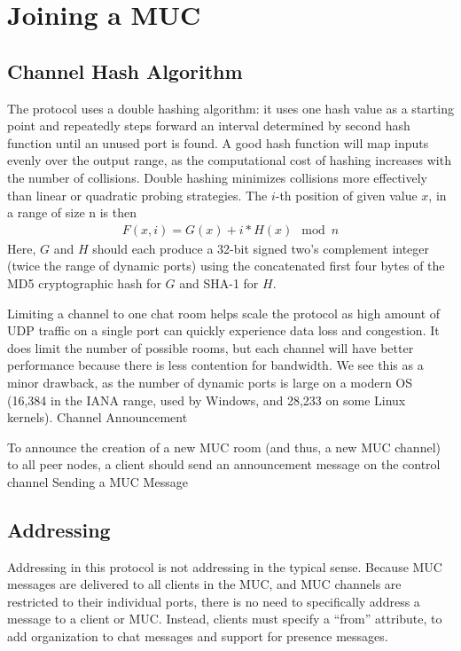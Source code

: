 \documentclass{article}
\begin{document}
\section{Joining a MUC}

\subsection{Channel Hash Algorithm}

The protocol uses a double hashing algorithm: it uses one hash value as a
starting point and repeatedly steps forward an interval determined by second
hash function until an unused port is found. A good hash function will map
inputs evenly over the output range, as the computational cost of hashing
increases with the number of collisions. Double hashing minimizes collisions
more effectively than linear or quadratic probing strategies. The $i$-th position
of given value $x$, in a range of size n is then 
\begin{align*}
F(x,i) = G(x) + i * H(x)\mod{n}
\end{align*}
Here, $G$
and $H$ should each produce a 32-bit signed two's complement integer (twice the
range of dynamic ports) using the concatenated first four bytes of the MD5
cryptographic hash for $G$ and SHA-1 for $H$.

Limiting a channel to one chat room helps scale the protocol as high amount of
UDP traffic on a single port can quickly experience data loss and congestion. It
does limit the number of possible rooms, but each channel will have better
performance because there is less contention for bandwidth. We see this as a
minor drawback, as the number of dynamic ports is large on a modern OS (16,384
in the IANA range, used by Windows, and 28,233 on some Linux kernels).
Channel Announcement

To announce the creation of a new MUC room (and thus, a new MUC channel) to all
peer nodes, a client should send an announcement message on the control channel 
Sending a MUC Message

\subsection{Addressing}

Addressing in this protocol is not addressing in the typical sense. Because MUC
messages are delivered to all clients in the MUC, and MUC channels are
restricted to their individual ports, there is no need to specifically address a
message to a client or MUC. Instead, clients must specify a ``from'' attribute, to
add organization to chat messages and support for presence messages.
\end{document}
